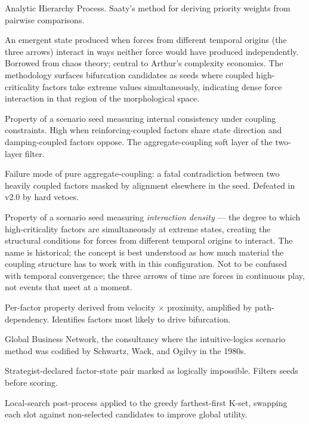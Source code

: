 \documentclass[11pt,a4paper]{article}
\begin{document}
\begin{description}[leftmargin=2.5cm, style=nextline]
  \item[AHP] Analytic Hierarchy Process. Saaty's method for deriving priority weights from pairwise comparisons.
  \item[Bifurcation] An emergent state produced when forces from different temporal origins (the three arrows) interact in ways neither force would have produced independently. Borrowed from chaos theory; central to Arthur's complexity economics. The methodology surfaces bifurcation candidates as seeds where coupled high-criticality factors take extreme values simultaneously, indicating dense force interaction in that region of the morphological space.
  \item[Coherence] Property of a scenario seed measuring internal consistency under coupling constraints. High when reinforcing-coupled factors share state direction and damping-coupled factors oppose. The aggregate-coupling soft layer of the two-layer filter.
  \item[Compensation effect] Failure mode of pure aggregate-coupling: a fatal contradiction between two heavily coupled factors masked by alignment elsewhere in the seed. Defeated in v2.0 by hard vetoes.
  \item[Convergence Potential] Property of a scenario seed measuring \emph{interaction density} — the degree to which high-criticality factors are simultaneously at extreme states, creating the structural conditions for forces from different temporal origins to interact. The name is historical; the concept is best understood as how much material the coupling structure has to work with in this configuration. Not to be confused with temporal convergence; the three arrows of time are forces in continuous play, not events that meet at a moment.
  \item[Criticality] Per-factor property derived from velocity $\times$ proximity, amplified by path-dependency. Identifies factors most likely to drive bifurcation.
  \item[GBN] Global Business Network, the consultancy where the intuitive-logics scenario method was codified by Schwartz, Wack, and Ogilvy in the 1980s.
  \item[Hard veto] Strategist-declared factor-state pair marked as logically impossible. Filters seeds before scoring.
  \item[Hill-climbing refinement] Local-search post-process applied to the greedy farthest-first K-set, swapping each slot against non-selected candidates to improve global utility.

\end{description}
\end{document}
